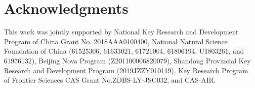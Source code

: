 \documentclass[sigconf]{acmart}
\begin{document}
\section{Acknowledgments}
This work was jointly supported by National Key Research and Development Program of China Grant No. 2018AAA0100400, National Natural Science Foundation of China (61525306, 61633021, 61721004, 61806194, U1803261, and 61976132), Beijing Nova Program (Z201100006820079), Shandong Provincial Key Research and Development Program (2019JZZY010119), Key Research Program of Frontier Sciences CAS Grant No.ZDBS-LY-JSC032, and CAS-AIR.



\end{document}

